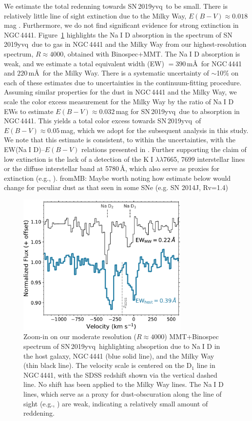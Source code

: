 \documentclass[twocolumn]{aastex63}
\def\ion#1#2{#1$\;${\footnotesize\rm{#2}}\relax}
\newcommand{\frommb}[1]{{\color{purple} fromMB: {#1}}}
\newcommand{\sn}{SN\,2019yvq}
\begin{document}
We estimate the total redenning towards \sn\ to be small. There is relatively
little line of sight extinction due to the Milky Way, $E(B-V) \approx
0.018$\,mag \citep{Schlafly11, Schlegel98}. Furthermore, we do not find
significant evidence for strong extinction in NGC\,4441. Figure~\ref{fig:NaD}
highlights the \ion{Na}{I} D absorption in the spectrum of \sn\ due to gas in
NGC\,4441 and the Milky Way from our highest-resolution spectrum, $R \approx
4000$, obtained with Binospec+MMT. The \ion{Na}{I} D absorption is weak, and
we estimate a total equivalent width (EW) $= 390$\,m\AA\ for NGC\,4441 and
$220$\,m\AA\ for the Milky Way. There is a systematic uncertainty of
$\sim$10\% on each of these estimates due to uncertainties in the
continuum-fitting procedure. Assuming similar properties for the dust in
NGC\,4441 and the Milky Way, we scale the color excess measurement for the
Milky Way by the ratio of \ion{Na}{I} D EWs to estimate $E(B-V) \approx
0.032$\,mag for \sn\ due to absorption in NGC\,4441. This yields a total color
excess towards \sn\ of $E(B-V) \approx 0.05$\,mag, which we adopt for the
subsequent analysis in this study. We note that this estimate is consistent,
to within the uncertainties, with the EW(\ion{Na}{I} D)--$E(B-V)$ relations
presented in \citet{Poznanski12}. Further supporting the claim of low
extinction is the lack of a detection of the \ion{K}{I} $\lambda\lambda$7665,
7699 interstellar lines or the diffuse interstellar band at 5780\,\AA, which
also serve as proxies for extinction (e.g., \citealt{Phillips13}).
\frommb{Maybe worth noting how estimate below would change for peculiar dust
as that seen in some SNe (e.g. SN 2014J, Rv=1.4)}

\begin{figure}
    \centering
    \includegraphics[width=3.35in]{./figures/NaD.pdf}
    \caption{Zoom-in on our moderate resolution ($R \approx 4000$)
    MMT+Binospec spectrum of \sn\ highlighting absoprtion due to \ion{Na}{I}
    D in the host galaxy, NGC\,4441 (blue solid line), and the Milky Way
    (thin black line). The velocity scale is centered on the D$_1$ line in
    NGC\,4441, with the SDSS redshift shown via the vertical dashed line. No
    shift has been applied to the Milky Way lines. The \ion{Na}{I} D lines,
    which serve as a proxy for dust-obscuration along the line of sight
    (e.g., \citealt{Poznanski12,Phillips13}) are weak, indicating a
    relatively small amount of reddening.}
    \label{fig:NaD}
\end{figure}
\end{document}
